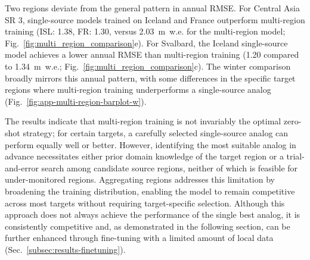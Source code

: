\documentclass[draft]{agujournal2019}
\begin{document}
Two regions deviate from the general pattern in annual RMSE. For Central Asia SR 3, single-source models trained on Iceland and France outperform multi-region training (ISL: 1.38, FR: 1.30, versus 2.03~m~w.e. for the multi-region model; Fig.~\ref{fig:multi_region_comparison}e). For Svalbard, the Iceland single-source model achieves a lower annual RMSE than multi-region training (1.20 compared to 1.34~m~w.e.; Fig.~\ref{fig:multi_region_comparison}c).  The winter comparison broadly mirrors this annual pattern, with some differences in the specific target regions where multi-region training underperforms a single-source analog (Fig.~\ref{fig:app-multi-region-barplot-w}).


The results indicate that multi-region training is not invariably the optimal zero-shot strategy; for certain targets, a carefully selected single-source analog can perform equally well or better. However, identifying the most suitable analog in advance necessitates either prior domain knowledge of the target region or a trial-and-error search among candidate source regions, neither of which is feasible for under-monitored regions. Aggregating regions addresses this limitation by broadening the training distribution, enabling the model to remain competitive across most targets without requiring target-specific selection. Although this approach does not always achieve the performance of the single best analog, it is consistently competitive and, as demonstrated in the following section, can be further enhanced through fine-tuning with a limited amount of local data (Sec.~\ref{subsec:results-finetuning}).
\end{document}
